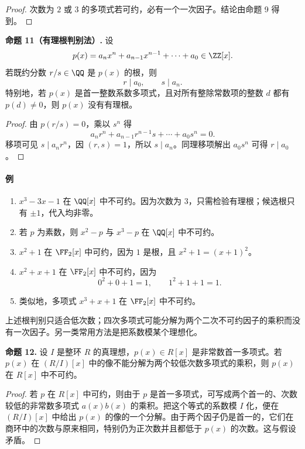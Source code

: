 \begin{proof}
	次数为 $2$ 或 $3$ 的多项式若可约，必有一个一次因子。结论由命题 9 得到。
\end{proof}

\noindent\textbf{命题 11（有理根判别法）.} 设
\[
p(x)=a_nx^n+a_{n-1}x^{n-1}+\cdots+a_0\in\ZZ[x].
\]
若既约分数 $r/s\in\QQ$ 是 $p(x)$ 的根，则
\[
r\mid a_0,
\qquad s\mid a_n.
\]
特别地，若 $p(x)$ 是首一整数系数多项式，且对所有整除常数项的整数 $d$ 都有 $p(d)\neq0$，则 $p(x)$ 没有有理根。

\begin{proof}
	由 $p(r/s)=0$，乘以 $s^n$ 得
	\[
	a_nr^n+a_{n-1}r^{n-1}s+\cdots+a_0s^n=0.
	\]
	移项可见 $s\mid a_nr^n$，因 $(r,s)=1$，所以 $s\mid a_n$。同理移项解出 $a_0s^n$ 可得 $r\mid a_0$。
\end{proof}

\paragraph{例}
\begin{enumerate}[label=(\arabic*)]
	\item $x^3-3x-1$ 在 $\QQ[x]$ 中不可约。因为次数为 $3$，只需检验有理根；候选根只有 $\pm1$，代入均非零。
	\item 若 $p$ 为素数，则 $x^2-p$ 与 $x^3-p$ 在 $\QQ[x]$ 中不可约。
	\item $x^2+1$ 在 $\FF_2[x]$ 中可约，因为 $1$ 是根，且 $x^2+1=(x+1)^2$。
	\item $x^2+x+1$ 在 $\FF_2[x]$ 中不可约，因为
\[
0^2+0+1=1,
\qquad
1^2+1+1=1.
\]
	\item 类似地，多项式 $x^3+x+1$ 在 $\FF_2[x]$ 中不可约。
\end{enumerate}

上述根判别只适合低次数；四次多项式可能分解为两个二次不可约因子的乘积而没有一次因子。另一类常用方法是把系数模某个理想化。

\noindent\textbf{命题 12.} 设 $I$ 是整环 $R$ 的真理想，$p(x)\in R[x]$ 是非常数首一多项式。若 $p(x)$ 在 $(R/I)[x]$ 中的像不能分解为两个较低次数多项式的乘积，则 $p(x)$ 在 $R[x]$ 中不可约。

\begin{proof}
	若 $p$ 在 $R[x]$ 中可约，则由于 $p$ 是首一多项式，可写成两个首一的、次数较低的非常数多项式 $a(x)b(x)$ 的乘积。把这个等式的系数模 $I$ 化，便在 $(R/I)[x]$ 中给出 $p(x)$ 的像的一个分解。由于两个因子仍是首一的，它们在商环中的次数与原来相同，特别仍为正次数并且都低于 $p(x)$ 的次数。这与假设矛盾。
\end{proof}

